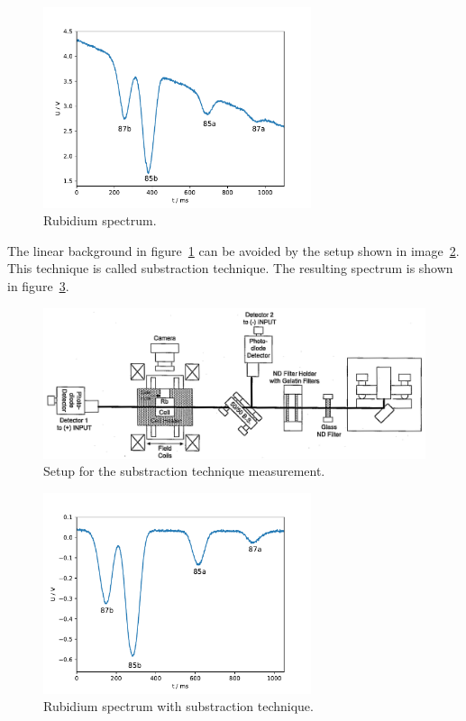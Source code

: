 \FloatBarrier
\begin{figure}
  \centering
  \includegraphics[width=0.7\textwidth]{Pics/Rb_spectrum.pdf}
  \caption{Rubidium spectrum.}
  \label{fig:spectrum}
\end{figure}
\FloatBarrier

The linear background in figure~\ref{fig:spectrum} can be avoided by the
setup shown in image~\ref{fig:setup_substraction}.
This technique is called substraction technique.
The resulting spectrum is shown in figure~\ref{fig:spectrum_sub}.

\begin{figure}
  \centering
  \includegraphics[width=\textwidth]{Pics/setup_substraction.png}
  \caption{Setup for the substraction technique measurement.\cite{anleitung}}
  \label{fig:setup_substraction}
\end{figure}


\begin{figure}
  \centering
  \includegraphics[width=0.7\textwidth]{Pics/Rb_spectrum_subst.pdf}
  \caption{Rubidium spectrum with substraction technique.}
  \label{fig:spectrum_sub}
\end{figure}
